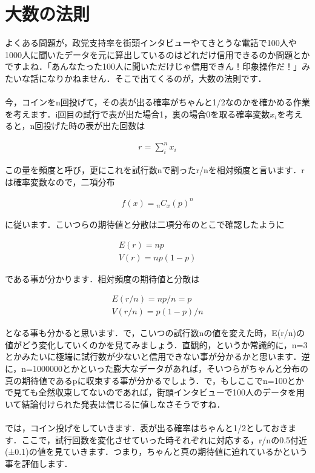 \documentclass[11pt,a4paper,uplatex]{ujreport} 	%
\begin{document}
\section{大数の法則}

よくある問題が，政党支持率を街頭インタビューやてきとうな電話で100人や1000人に聞いたデータを元に算出しているのはどれだけ信用できるのか問題とかですよね．「あんなたった100人に聞いただけじゃ信用できん！印象操作だ！」みたいな話になりかねません．そこで出てくるのが，大数の法則です．\\
\\

今，コインをn回投げて，その表が出る確率がちゃんと1/2なのかを確かめる作業を考えます．i回目の試行で表が出た場合1，裏の場合0を取る確率変数$x_i$を考えると，n回投げた時の表が出た回数は

\begin{align}
  r = \sum_i^n x_i
\end{align}

この量を頻度と呼び，更にこれを試行数nで割ったr/nを相対頻度と言います．rは確率変数なので，二項分布

\begin{align}
  f(x) = {}_n C_x (p)^n
\end{align}


に従います．こいつらの期待値と分散は二項分布のとこで確認したように

\begin{align}
  E(r) = np\\
  V(r) = np(1-p)
\end{align}

である事が分かります．相対頻度の期待値と分散は

\begin{align}
  E(r/n) = np/n = p\\
  V(r/n) = p(1-p)/n
\end{align}

となる事も分かると思います．で，こいつの試行数nの値を変えた時，E(r/n)の値がどう変化していくのかを見てみましょう．直観的，というか常識的に，n=3とかみたいに極端に試行数が少ないと信用できない事が分かるかと思います．逆に，n=1000000とかといった膨大なデータがあれば，そいつらがちゃんと分布の真の期待値であるpに収束する事が分かるでしょう．で，もしここでn=100とかで見ても全然収束してないのであれば，街頭インタビューで100人のデータを用いて結論付けられた発表は信じるに値しなさそうですね．\\
\\

では，コイン投げをしていきます．表が出る確率はちゃんと1/2としておきます．ここで，試行回数を変化させていった時それぞれに対応する，r/nの0.5付近(±0.1)の値を見ていきます．つまり，ちゃんと真の期待値に迫れているかという事を評価します．
\end{document}
